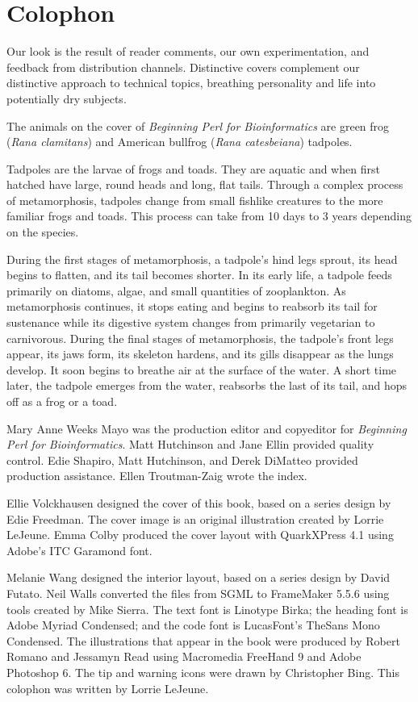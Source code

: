 \chapter*{Colophon}
\label{chap:colophon}

Our look is the result of reader comments, our own experimentation, and feedback from distribution channels. Distinctive covers complement our distinctive approach to technical topics, breathing personality and life into potentially dry subjects.

The animals on the cover of \textit{Beginning Perl for Bioinformatics} are green frog (\textit{Rana clamitans}) and American bullfrog (\textit{Rana catesbeiana}) tadpoles.

Tadpoles are the larvae of frogs and toads. They are aquatic and when first hatched have large, round heads and long, flat tails. Through a complex process of metamorphosis, tadpoles change from small fishlike creatures to the more familiar frogs and toads. This process can take from 10 days to 3 years depending on the species.

During the first stages of metamorphosis, a tadpole's hind legs sprout, its head begins to flatten, and its tail becomes shorter. In its early life, a tadpole feeds primarily on diatoms, algae, and small quantities of zooplankton. As metamorphosis continues, it stops eating and begins to reabsorb its tail for sustenance while its digestive system changes from primarily vegetarian to carnivorous. During the final stages of metamorphosis, the tadpole's front legs appear, its jaws form, its skeleton hardens, and its gills disappear as the lungs develop. It soon begins to breathe air at the surface of the water. A short time later, the tadpole emerges from the water, reabsorbs the last of its tail, and hops off as a frog or a toad.

Mary Anne Weeks Mayo was the production editor and copyeditor for \textit{Beginning Perl for Bioinformatics}. Matt Hutchinson and Jane Ellin provided quality control. Edie Shapiro, Matt Hutchinson, and Derek DiMatteo provided production assistance. Ellen Troutman-Zaig wrote the index.

Ellie Volckhausen designed the cover of this book, based on a series design by Edie Freedman. The cover image is an original illustration created by Lorrie LeJeune. Emma Colby produced the cover layout with Quark\texttrademark XPress 4.1 using Adobe's ITC Garamond font.

Melanie Wang designed the interior layout, based on a series design by David Futato. Neil Walls converted the files from SGML to FrameMaker 5.5.6 using tools created by Mike Sierra. The text font is Linotype Birka; the heading font is Adobe Myriad Condensed; and the code font is LucasFont's TheSans Mono Condensed. The illustrations that appear in the book were produced by Robert Romano and Jessamyn Read using Macromedia FreeHand 9 and Adobe Photoshop 6. The tip and warning icons were drawn by Christopher Bing. This colophon was written by Lorrie LeJeune.
